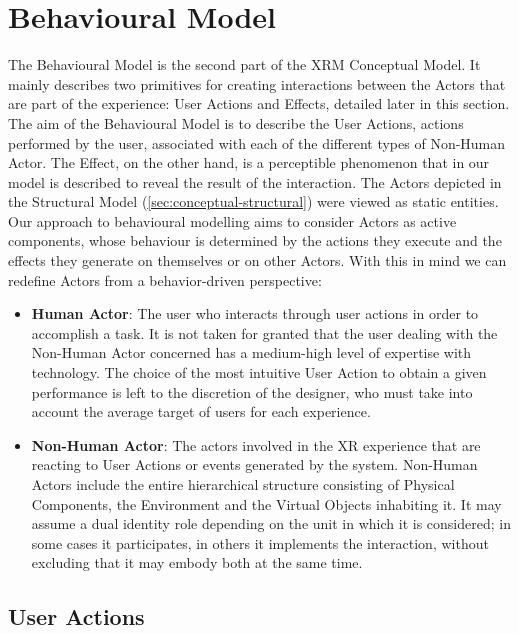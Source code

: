 \section{Behavioural Model}
\label{sec:conceptual-behavioral}

The Behavioural Model is the second part of the XRM Conceptual Model. It mainly describes two primitives for creating interactions between the Actors that are part of the experience: User Actions and Effects, detailed later in this section. \\
The aim of the Behavioural Model is to describe the User Actions, actions performed by the user, associated with each of the different types of Non-Human Actor. The Effect, on the other hand, is a perceptible phenomenon that in our model is described to reveal the result of the interaction. 
The Actors depicted in the Structural Model (\autoref{sec:conceptual-structural}) were viewed as static entities. Our approach to behavioural modelling aims to consider Actors as active components, whose behaviour is determined by the actions they execute and the effects they generate on themselves or on other Actors. 
With this in mind we can redefine Actors from a behavior-driven perspective: 
\begin{itemize}
    \item \textbf{Human Actor}: The user who interacts through user actions in order to accomplish a task. It is not taken for granted that the user dealing with the Non-Human Actor concerned has a medium-high level of expertise with technology. The choice of the most intuitive User Action to obtain a given performance is left to the discretion of the designer, who must take into account the average target of users for each experience. 
    \item \textbf{Non-Human Actor}: The actors involved in the XR experience that are reacting to User Actions or events generated by the system. Non-Human Actors include the entire hierarchical structure consisting of Physical Components, the Environment and the Virtual Objects inhabiting it.  It may assume a dual identity role depending on the unit in which it is considered; in some cases it participates, in others it implements the interaction, without excluding that it may embody both at the same time. 
\end{itemize}

\subsection*{User Actions}

